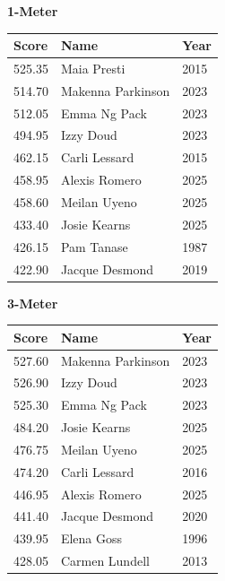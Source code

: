 \vspace{1.2em}
\noindent\begin{minipage}[t]{0.48\textwidth}
\centering
\textbf{\textcolor{teamprimary}{1-Meter}}\par
\vspace{0.5em}
\centering
\small
\renewcommand{\arraystretch}{1.0}
\setlength{\tabcolsep}{4pt}
\begin{tabular}{@{}p{1.8cm}p{3.0cm}p{1.0cm}@{}}
\toprule
\textbf{Score} & \textbf{Name} & \textbf{Year} \\
\midrule
525.35 & Maia Presti & 2015 \\
514.70 & Makenna Parkinson & 2023 \\
512.05 & Emma Ng Pack & 2023 \\
494.95 & Izzy Doud & 2023 \\
462.15 & Carli Lessard & 2015 \\
458.95 & Alexis Romero & 2025 \\
458.60 & Meilan Uyeno & 2025 \\
433.40 & Josie Kearns & 2025 \\
426.15 & Pam Tanase & 1987 \\
422.90 & Jacque Desmond & 2019 \\
\bottomrule
\end{tabular}
\end{minipage}
\hfill
\begin{minipage}[t]{0.48\textwidth}
\centering
\textbf{\textcolor{teamprimary}{3-Meter}}\par
\vspace{0.5em}
\centering
\small
\renewcommand{\arraystretch}{1.0}
\setlength{\tabcolsep}{4pt}
\begin{tabular}{@{}p{1.8cm}p{3.0cm}p{1.0cm}@{}}
\toprule
\textbf{Score} & \textbf{Name} & \textbf{Year} \\
\midrule
527.60 & Makenna Parkinson & 2023 \\
526.90 & Izzy Doud & 2023 \\
525.30 & Emma Ng Pack & 2023 \\
484.20 & Josie Kearns & 2025 \\
476.75 & Meilan Uyeno & 2025 \\
474.20 & Carli Lessard & 2016 \\
446.95 & Alexis Romero & 2025 \\
441.40 & Jacque Desmond & 2020 \\
439.95 & Elena Goss & 1996 \\
428.05 & Carmen Lundell & 2013 \\
\bottomrule
\end{tabular}
\end{minipage}
